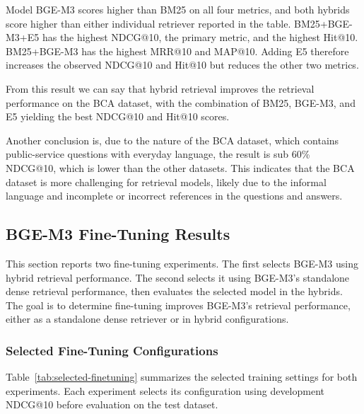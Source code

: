 Model BGE-M3 scores higher than BM25 on all four metrics, and both hybrids score higher than either individual retriever reported in the table. BM25+BGE-M3+E5 has the highest NDCG@10, the primary metric, and the highest Hit@10. BM25+BGE-M3 has the highest MRR@10 and MAP@10. Adding E5 therefore increases the observed NDCG@10 and Hit@10 but reduces the other two metrics.

From this result we can say that hybrid retrieval improves the retrieval performance on the BCA dataset, with the combination of BM25, BGE-M3, and E5 yielding the best NDCG@10 and Hit@10 scores.

Another conclusion is, due to the nature of the BCA dataset, which contains public-service questions with everyday language, the result is sub 60\% NDCG@10, which is lower than the other datasets. This indicates that the BCA dataset is more challenging for retrieval models, likely due to the informal language and incomplete or incorrect references in the questions and answers.


\subsection{BGE-M3 Fine-Tuning Results}
\label{sec:finetuning-results}

This section reports two fine-tuning experiments. The first selects BGE-M3 using hybrid retrieval performance. The second selects it using BGE-M3's standalone dense retrieval performance, then evaluates the selected model in the hybrids. The goal is to determine fine-tuning improves BGE-M3's retrieval performance, either as a standalone dense retriever or in hybrid configurations.

\subsubsection{Selected Fine-Tuning Configurations}

Table~\ref{tab:selected-finetuning} summarizes the selected training settings for both experiments. Each experiment selects its configuration using development NDCG@10 before evaluation on the test dataset.

